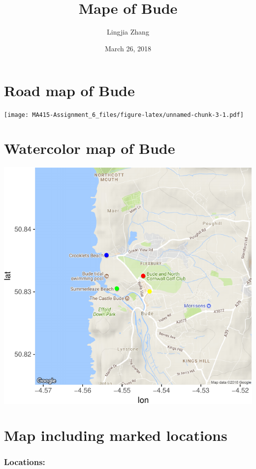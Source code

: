 \documentclass[]{article}
\title{Mape of Bude}
\author{Lingjia Zhang}
\date{March 26, 2018}
\begin{document}
\maketitle

\section{Road map of Bude}\label{road-map-of-bude}

\texttt{[image: MA415-Assignment\_6\_files/figure-latex/unnamed-chunk-3-1.pdf]}

\section{Watercolor map of Bude}\label{watercolor-map-of-bude}

\includegraphics{MA415-Assignment_6_files/figure-latex/unnamed-chunk-4-1.pdf}

\section{Map including marked
locations}\label{map-including-marked-locations}

\subsubsection{Locations:}\label{locations}
\end{document}

